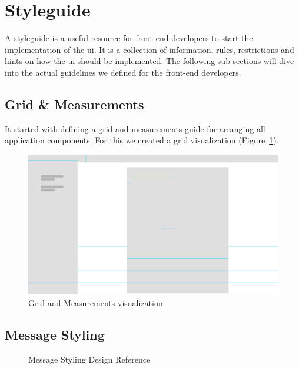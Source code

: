 \section{Styleguide}\label{sec:styleguide}
A styleguide is a useful resource for front-end developers to start the implementation of the \ac{ui}.
It is a collection of information, rules, restrictions and hints on how the \ac{ui} should be implemented.
The following sub sections will dive into the actual guidelines we defined for the front-end developers.

\subsection{Grid \& Measurements}\label{subsec:grid-and-measurements}

It started with defining a grid and measurements guide for arranging all application components. For this we created a
grid visualization (Figure~\ref{fig:grid}).

\begin{figure}[!ht]
    \centering
    \includegraphics[width=1.0\textwidth]{./images/grid.pdf}
    \caption{Grid and Measurements visualization}
    \label{fig:grid}
\end{figure}

\subsection{Message Styling}\label{subsec:message-styling}

\begin{figure}[ht]
    \caption{Message Styling Design Reference}
    \centering\def\svgwidth{15cm}\label{fig:figure2}
\end{figure}

